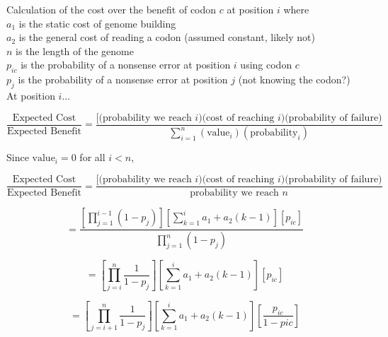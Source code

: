 \documentclass[11pt]{article} %
\begin{document}


Calculation of the cost over the benefit of codon $c$ at position $i$ where\\
$a_1$ is the static cost of genome building\\
$a_2$ is the general cost of reading a codon (assumed constant, likely not)\\
$n$ is the length of the genome\\
$p_{ic}$ is the probability of a nonsense error at position $i$ using codon $c$\\
$p_j$ is the probability of a nonsense error at position $j$ (not knowing the codon?)\\


At position $i$...

$$\frac{\mbox{Expected Cost}}{\mbox{Expected Benefit}} =
\frac{[\mbox{(probability we reach $i$)(cost of reaching $i$)(probability of failure)}}
{ \sum_{i=1}^{n}(\mbox{value}_i)(\mbox{probability}_i) }$$

Since $\mbox{value}_i = 0$ for all $i<n$,

$$\frac{\mbox{Expected Cost}}{\mbox{Expected Benefit}} =
\frac{[\mbox{(probability we reach $i$)(cost of reaching $i$)(probability of failure)}}
{ \mbox{probability we reach $n$}}$$


$$=
\frac{
\left[\prod_{j=1}^{i-1}(1 - p_{j})\right]
\left[\sum_{k=1}^{i} a_1 + a_2(k-1)\right]
\left[p_{ic}\right]
}{
\prod_{j=1}^{n}(1 - p_{j})
}$$


$$=
\left[\prod_{j=i}^{n}\frac{1}{1 - p_{j}}\right]
\left[\sum_{k=1}^{i} a_1 + a_2(k-1)\right]
\left[p_{ic}\right]
$$


$$=
\left[\prod_{j=i+1}^{n}\frac{1}{1 - p_{j}}\right]
\left[\sum_{k=1}^{i} a_1 + a_2(k-1)\right]
\left[\frac{p_{ic}}{1-p{ic}}\right]
$$


\end{document}
